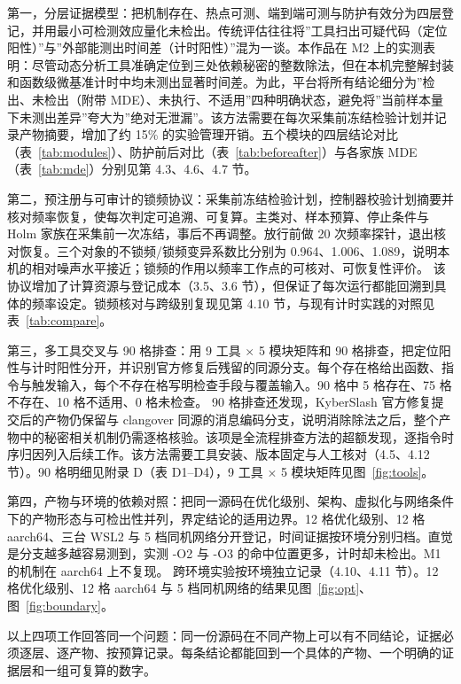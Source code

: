第一，分层证据模型：把机制存在、热点可测、端到端可测与防护有效分为四层登记，并用最小可检测效应量化未检出。传统评估往往将”工具扫出可疑代码（定位阳性）”与”外部能测出时间差（计时阳性）”混为一谈。本作品在 M2 上的实测表明：尽管动态分析工具准确定位到三处依赖秘密的整数除法，但在本机完整解封装和函数级微基准计时中均未测出显著时间差。为此，平台将所有结论细分为”检出、未检出（附带 MDE）、未执行、不适用”四种明确状态，避免将”当前样本量下未测出差异”夸大为”绝对无泄漏”。该方法需要在每次采集前冻结检验计划并记录产物摘要，增加了约 15\% 的实验管理开销。五个模块的四层结论对比（表~\ref{tab:modules}）、防护前后对比（表~\ref{tab:beforeafter}）与各家族 MDE（表~\ref{tab:mde}）分别见第 4.3、4.6、4.7 节。

第二，预注册与可审计的锁频协议：采集前冻结检验计划，控制器校验计划摘要并核对频率恢复，使每次判定可追溯、可复算。主类对、样本预算、停止条件与 Holm 家族在采集前一次冻结，事后不再调整。放行前做 20 次频率探针，退出核对恢复。三个对象的不锁频/锁频变异系数比分别为 0.964、1.006、1.089，说明本机的相对噪声水平接近；锁频的作用以频率工作点的可核对、可恢复性评价。%
该协议增加了计算资源与登记成本（3.5、3.6 节），但保证了每次运行都能回溯到具体的频率设定。锁频核对与跨级别复现见第 4.10 节，与现有计时实践的对照见表~\ref{tab:compare}。

第三，多工具交叉与 90 格排查：用 9 工具 $\times$ 5 模块矩阵和 90 格排查，把定位阳性与计时阳性分开，并识别官方修复后残留的同源分支。每个存在格给出函数、指令与触发输入，每个不存在格写明检查手段与覆盖输入。90 格中 5 格存在、75 格不存在、10 格不适用、0 格未检查。%
90 格排查还发现，KyberSlash 官方修复提交后的产物仍保留与 clangover 同源的消息编码分支，说明消除除法之后，整个产物中的秘密相关机制仍需逐格核验。该项是全流程排查方法的超额发现，逐指令时序归因列入后续工作。该方法需要工具安装、版本固定与人工核对（4.5、4.12 节）。90 格明细见附录 D（表 D1--D4），9 工具 × 5 模块矩阵见图~\ref{fig:tools}。

第四，产物与环境的依赖对照：把同一源码在优化级别、架构、虚拟化与网络条件下的产物形态与可检出性并列，界定结论的适用边界。12 格优化级别、12 格 aarch64、三台 WSL2 与 5 档同机网络分开登记，时间证据按环境分别归档。直觉是分支越多越容易测到，实测 -O2 与 -O3 的命中位置更多，计时却未检出。M1 的机制在 aarch64 上不复现。%
跨环境实验按环境独立记录（4.10、4.11 节）。12 格优化级别、12 格 aarch64 与 5 档同机网络的结果见图~\ref{fig:opt}、图~\ref{fig:boundary}。

以上四项工作回答同一个问题：同一份源码在不同产物上可以有不同结论，证据必须逐层、逐产物、按预算记录。每条结论都能回到一个具体的产物、一个明确的证据层和一组可复算的数字。


